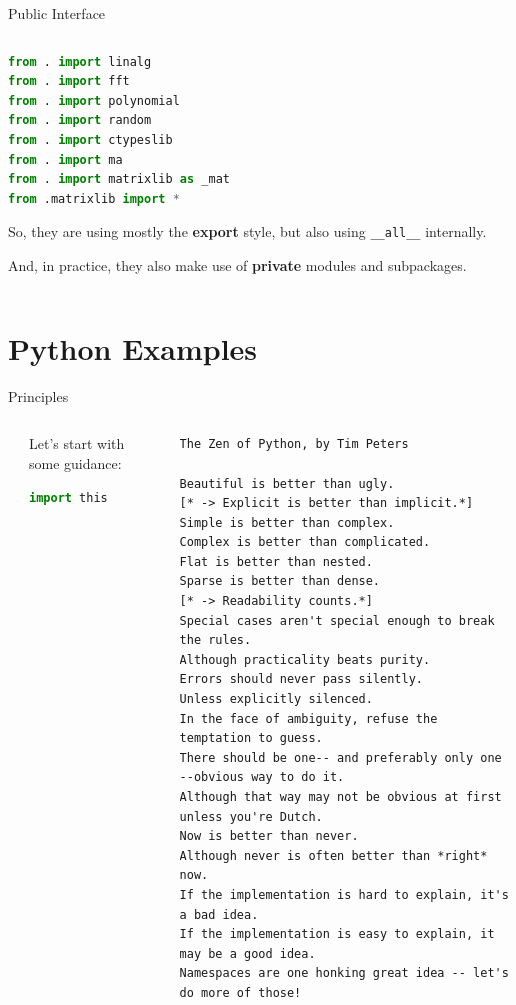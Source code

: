 \documentclass[9pt]{beamer}
\begin{document}
\begin{frame}[fragile]{Public Interface}
\begin{columns}
\begin{column}{0.47\textwidth}
\begin{lstlisting}[language=Python,style=mystyle,firstnumber=140]
from . import linalg
from . import fft
from . import polynomial
from . import random
from . import ctypeslib
from . import ma
from . import matrixlib as _mat
from .matrixlib import *\end{lstlisting}
        So, they are using mostly the \textbf{export} style, but also using
        \texttt{\_\_all\_\_} internally.
        \begin{flushright}
            \footnotesize
            \hspace*{15em}And, in practice, they also make use of
            \textbf{private} modules and subpackages.
        \end{flushright}
        \end{column}
    \end{columns}
\end{frame}

\section{Python Examples}


\begin{frame}[fragile]{Principles}
    \begin{columns}
        \begin{column}{0.02\textwidth}
        \end{column}
        \begin{column}{0.38\textwidth}
            Let's start with some guidance:
            \begin{lstlisting}[language=Python,style=mystyle]
import this\end{lstlisting}
        \end{column}
        \begin{column}{0.6\textwidth}
            \begin{lstlisting}[style=mystyle]
The Zen of Python, by Tim Peters

Beautiful is better than ugly.
[* -> Explicit is better than implicit.*]
Simple is better than complex.
Complex is better than complicated.
Flat is better than nested.
Sparse is better than dense.
[* -> Readability counts.*]
Special cases aren't special enough to break the rules.
Although practicality beats purity.
Errors should never pass silently.
Unless explicitly silenced.
In the face of ambiguity, refuse the temptation to guess.
There should be one-- and preferably only one --obvious way to do it.
Although that way may not be obvious at first unless you're Dutch.
Now is better than never.
Although never is often better than *right* now.
If the implementation is hard to explain, it's a bad idea.
If the implementation is easy to explain, it may be a good idea.
Namespaces are one honking great idea -- let's do more of those!\end{lstlisting}
        \end{column}
    \end{columns}
\end{frame}
\end{document}
